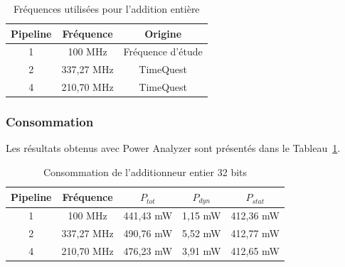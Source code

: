 \documentclass[12pt,a4paper]{article}
\begin{document}
\begin{table}[H]
    \centering
    \caption{Fréquences utilisées pour l'addition entière}

    \begin{tabular}{ccc}
        \toprule
        \textbf{Pipeline} &
        \textbf{Fréquence} &
        \textbf{Origine} \\
        \midrule

        1 & 100 MHz & Fréquence d'étude \\
        2 & 337,27 MHz & TimeQuest \\
        4 & 210,70 MHz & TimeQuest \\

        \bottomrule
    \end{tabular}
\end{table}



\subsubsection{Consommation}

Les résultats obtenus avec Power Analyzer sont présentés dans le
Tableau~\ref{tab:power_integer}.

\begin{table}[H]
    \centering

    \caption{Consommation de l'additionneur entier 32 bits}

    \label{tab:power_integer}

    \begin{tabular}{ccccc}
        \toprule

        \textbf{Pipeline} &
        \textbf{Fréquence} &
        \textbf{$P_{tot}$} &
        \textbf{$P_{dyn}$} &
        \textbf{$P_{stat}$} \\

        \midrule

        1 & 100 MHz
          & 441,43 mW
          & 1,15 mW
          & 412,36 mW \\

        2 & 337,27 MHz
          & 490,76 mW
          & 5,52 mW
          & 412,77 mW \\

        4 & 210,70 MHz
          & 476,23 mW
          & 3,91 mW
          & 412,65 mW \\

        \bottomrule
    \end{tabular}
\end{table}
\end{document}
